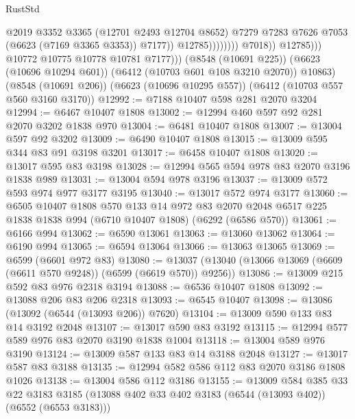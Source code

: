 \begin{lexlean}{RustStd}
\begin{coremodule}
                                          @2019
                                          @3352
                                          @3365
                                          (@12701 @2493 @12704 @8652)
                                          @7279
                                          @7283
                                          @7626
                                          @7053
                                          (@6623 (@7169 @3365 @3353))
                                          @7177))
                                      @12785))))))))
                      @7018))
                  @12785)))
            @10772
            @10775
            @10778
            @10781
            @7177)))
      (@8548 (@10691 @225))
      (@6623 (@10696 @10294 @601))
      (@6412 (@10703 @601 @108 @3210 @2070))
      @10863)
    (@8548 (@10691 @206))
    (@6623 (@10696 @10295 @557))
    (@6412 (@10703 @557 @560 @3160 @3170))
@12992 := @7188 @10407 @598 @281 @2070 @3204
@12994 := @6467 @10407 @1808
@13002 := @12994 @460 @597 @92 @281 @2070 @3202 @1838 @970
@13004 := @6481 @10407 @1808
@13007 := @13004 @597 @92 @3202
@13009 := @6490 @10407 @1808
@13015 := @13009 @595 @344 @83 @91 @3198 @3201
@13017 := @6458 @10407 @1808
@13020 := @13017 @595 @83 @3198
@13028 := @12994 @565 @594 @978 @83 @2070 @3196 @1838 @989
@13031 := @13004 @594 @978 @3196
@13037 := @13009 @572 @593 @974 @977 @3177 @3195
@13040 := @13017 @572 @974 @3177
@13060 := @6505
    @10407
    @1808
    @570
    @133
    @14
    @972
    @83
    @2070
    @2048
    @6517
    @225
    @1838
    @1838
    @994
    (@6710 @10407 @1808)
    (@6292 (@6586 @570))
@13061 := @6166 @994
@13062 := @6590 @13061
@13063 := @13060 @13062
@13064 := @6190 @994
@13065 := @6594 @13064
@13066 := @13063 @13065
@13069 := @6599 (@6601 @972 @83)
@13080 := @13037 (@13040 (@13066 @13069 (@6609 (@6611 @570 @9248)) (@6599 (@6619 @570)) @9256))
@13086 := @13009 @215 @592 @83 @976 @2318 @3194
@13088 := @6536 @10407 @1808
@13092 := @13088 @206 @83 @206 @2318
@13093 := @6545 @10407
@13098 := @13086 (@13092 (@6544 (@13093 @206)) @7620)
@13104 := @13009 @590 @133 @83 @14 @3192 @2048
@13107 := @13017 @590 @83 @3192
@13115 := @12994 @577 @589 @976 @83 @2070 @3190 @1838 @1004
@13118 := @13004 @589 @976 @3190
@13124 := @13009 @587 @133 @83 @14 @3188 @2048
@13127 := @13017 @587 @83 @3188
@13135 := @12994 @582 @586 @112 @83 @2070 @3186 @1808 @1026
@13138 := @13004 @586 @112 @3186
@13155 := @13009
    @584
    @385
    @33
    @22
    @3183
    @3185
    (@13088 @402 @33 @402 @3183 (@6544 (@13093 @402)) (@6552 (@6553 @3183)))

\end{coremodule}
\end{lexlean}
